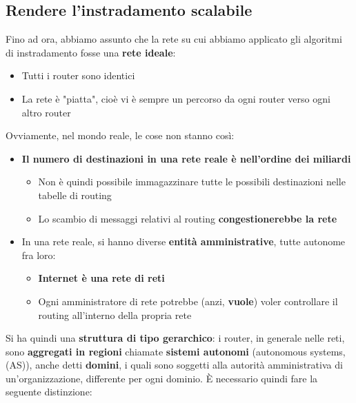\documentclass[12pt]{article}
\begin{document}
\subsection{Rendere l'instradamento scalabile}
Fino ad ora, abbiamo assunto che la rete su cui abbiamo applicato gli algoritmi di instradamento fosse una \textbf{rete ideale}:
\begin{itemize}
    \item Tutti i router sono identici
    \item La rete è "piatta", cioè vi è sempre un percorso da ogni router verso ogni altro router
\end{itemize}
Ovviamente, nel mondo reale, le cose non stanno così:
\begin{itemize}
    \item \textbf{Il numero di destinazioni in una rete reale è nell'ordine dei miliardi}
    \begin{itemize}
        \item Non è quindi possibile immagazzinare tutte le possibili destinazioni nelle tabelle di routing
        \item Lo scambio di messaggi relativi al routing \textbf{congestionerebbe la rete}
    \end{itemize}
    \item In una rete reale, si hanno diverse \textbf{entità amministrative}, tutte autonome fra loro:
    \begin{itemize}
        \item \textbf{Internet è una rete di reti}
        \item Ogni amministratore di rete potrebbe (anzi, \textbf{vuole}) voler controllare il routing all'interno della propria rete
    \end{itemize}
\end{itemize}
Si ha quindi una \textbf{struttura di tipo gerarchico}: i router, in generale nelle reti, sono \textbf{aggregati in regioni} chiamate \textbf{sistemi autonomi} (autonomous systems, (AS)), anche detti \textbf{domini}, i quali sono soggetti
alla autorità amministrativa di un'organizzazione, differente per ogni dominio.
È necessario quindi fare la seguente distinzione:
\end{document}
